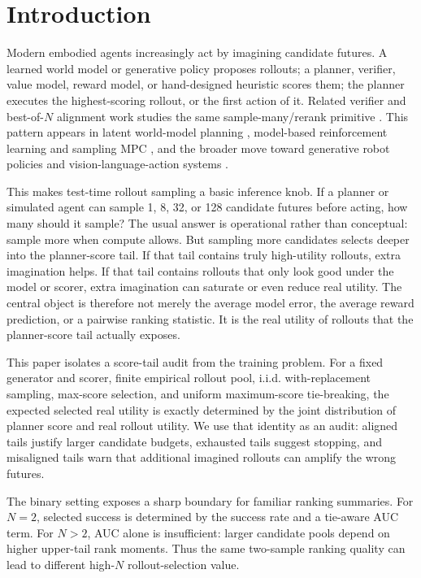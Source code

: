 \documentclass{article}
\begin{document}
\section{Introduction}

Modern embodied agents increasingly act by imagining candidate futures. A learned world model or generative policy proposes rollouts; a planner, verifier, value model, reward model, or hand-designed heuristic scores them; the planner executes the highest-scoring rollout, or the first action of it. Related verifier and best-of-$N$ alignment work studies the same sample-many/rerank primitive \citep{cobbe2021verifiers,beirami2024bestofn}. This pattern appears in latent world-model planning \citep{ha2018worldmodels,hafner2019planet,hafner2020dreamer,hafner2023dreamerv3,hansen2024tdmpc2}, model-based reinforcement learning and sampling MPC \citep{chua2018pets,rubinstein1999cem,williams2017itmmpc}, and the broader move toward generative robot policies and vision-language-action systems \citep{brohan2022rt1,brohan2023rt2,chi2023diffusionpolicy,octo2024}.

This makes test-time rollout sampling a basic inference knob. If a planner or simulated agent can sample 1, 8, 32, or 128 candidate futures before acting, how many should it sample? The usual answer is operational rather than conceptual: sample more when compute allows. But sampling more candidates selects deeper into the planner-score tail. If that tail contains truly high-utility rollouts, extra imagination helps. If that tail contains rollouts that only look good under the model or scorer, extra imagination can saturate or even reduce real utility. The central object is therefore not merely the average model error, the average reward prediction, or a pairwise ranking statistic. It is the real utility of rollouts that the planner-score tail actually exposes.

This paper isolates a score-tail audit from the training problem. For a fixed generator and scorer, finite empirical rollout pool, i.i.d. with-replacement sampling, max-score selection, and uniform maximum-score tie-breaking, the expected selected real utility is exactly determined by the joint distribution of planner score and real rollout utility. We use that identity as an audit: aligned tails justify larger candidate budgets, exhausted tails suggest stopping, and misaligned tails warn that additional imagined rollouts can amplify the wrong futures.

The binary setting exposes a sharp boundary for familiar ranking summaries. For $N=2$, selected success is determined by the success rate and a tie-aware AUC term. For $N>2$, AUC alone is insufficient: larger candidate pools depend on higher upper-tail rank moments. Thus the same two-sample ranking quality can lead to different high-$N$ rollout-selection value.
\end{document}
